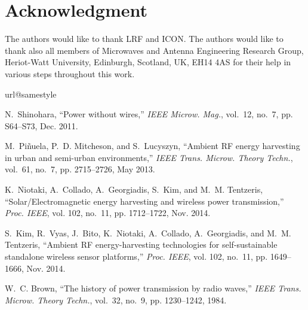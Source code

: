\documentclass[journal]{IEEEtran}
\begin{document}
\section*{Acknowledgment}
\normalsize
The authors  would like
to thank LRF and ICON. The authors would like to thank also
all members of Microwaves and Antenna Engineering Research
Group, Heriot-Watt University, Edinburgh, Scotland,
UK, EH14 4AS for their help in various steps throughout this
work.

\begin{thebibliography}{10}
\providecommand{\url}[1]{#1}
\csname url@samestyle\endcsname
\providecommand{\newblock}{\relax}
\providecommand{\bibinfo}[2]{#2}
\providecommand{\BIBentrySTDinterwordspacing}{\spaceskip=0pt\relax}
\providecommand{\BIBentryALTinterwordstretchfactor}{4}
\providecommand{\BIBentryALTinterwordspacing}{\spaceskip=\fontdimen2\font plus
\BIBentryALTinterwordstretchfactor\fontdimen3\font minus
  \fontdimen4\font\relax}
\providecommand{\BIBforeignlanguage}[2]{{%
\expandafter\ifx\csname l@#1\endcsname\relax
\typeout{** WARNING: IEEEtran.bst: No hyphenation pattern has been}%
\typeout{** loaded for the language `#1'. Using the pattern for}%
\typeout{** the default language instead.}%
\else
\language=\csname l@#1\endcsname
\fi
#2}}
\providecommand{\BIBdecl}{\relax}
\BIBdecl

N.~Shinohara, ``Power without wires,'' \emph{{IEEE} Microw. Mag.}, vol.~12,
  no.~7, pp. S64--S73, Dec. 2011.

M.~Pi{\~n}uela, P.~D. Mitcheson, and S.~Lucyszyn, ``Ambient {RF} energy
  harvesting in urban and semi-urban environments,'' \emph{{IEEE} Trans.
  Microw. Theory Techn.}, vol.~61, no.~7, pp. 2715--2726, May 2013.

K.~Niotaki, A.~Collado, A.~Georgiadis, S.~Kim, and M.~M. Tentzeris,
  ``Solar/{E}lectromagnetic energy harvesting and wireless power
  transmission,'' \emph{Proc. {IEEE}}, vol. 102, no.~11, pp. 1712--1722, Nov.
  2014.

S.~Kim, R.~Vyas, J.~Bito, K.~Niotaki, A.~Collado, A.~Georgiadis, and M.~M.
  Tentzeris, ``Ambient {RF} energy-harvesting technologies for self-sustainable
  standalone wireless sensor platforms,'' \emph{Proc. {IEEE}}, vol. 102,
  no.~11, pp. 1649--1666, Nov. 2014.

W.~C. Brown, ``The history of power transmission by radio waves,'' \emph{{IEEE}
  Trans. Microw. Theory Techn.}, vol.~32, no.~9, pp. 1230--1242, 1984.


\end{thebibliography}
\end{document}
